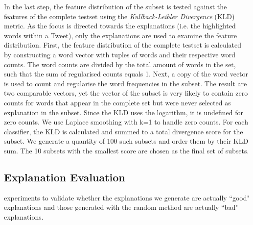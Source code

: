 In the last step, the feature distribution of the subset is tested against the features of the complete testset using the \textit{Kullback-Leibler Divergence} (KLD) metric. As the focus is directed towards the explanations (i.e. the highlighted words within a Tweet), only the explanations are used to examine the feature distribution. First, the feature distribution of the complete testset is calculated by constructing a word vector with tuples of words and their respective word counts. The word counts are divided by the total amount of words in the set, such that the sum of regularised counts equals 1. Next, a copy of the word vector is used to count and regularise the word frequencies in the subset. The result are two comparable vectors, yet the vector of the subset is very likely to contain zero counts for words that appear in the complete set but were never selected as explanation in the subset. Since the KLD uses the logarithm, it is undefined for zero counts. We use Laplace smoothing with k=1 to handle zero counts. For each classifier, the KLD is calculated and summed to a total divergence score for the subset.\newline
We generate a quantity of 100 such subsets and order them by their KLD sum. The 10 subsets with the smallest score are chosen as the final set of subsets.\newline




\subsection{Explanation Evaluation}
\label{subsec:expleval}
experiments to validate whether the explanations we generate are actually ``good" explanations and those generated with the random method are actually ``bad" explanations.


